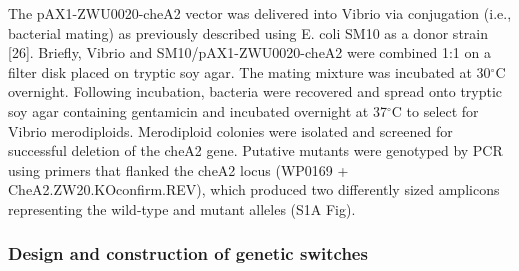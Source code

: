 The pAX1-ZWU0020-cheA2 vector was delivered into Vibrio via conjugation (i.e., bacterial mating) as previously described using E. coli SM10 as a donor strain [26]. Briefly, Vibrio and SM10/pAX1-ZWU0020-cheA2 were combined 1:1 on a filter disk placed on tryptic soy agar. The mating mixture was incubated at 30$^\circ$C overnight. Following incubation, bacteria were recovered and spread onto tryptic soy agar containing gentamicin and incubated overnight at 37$^\circ$C to select for Vibrio merodiploids. Merodiploid colonies were isolated and screened for successful deletion of the cheA2 gene. Putative mutants were genotyped by PCR using primers that flanked the cheA2 locus (WP0169 + CheA2.ZW20.KOconfirm.REV), which produced two differently sized amplicons representing the wild-type and mutant alleles (S1A Fig). 

\subsubsection{Design and construction of genetic switches}
